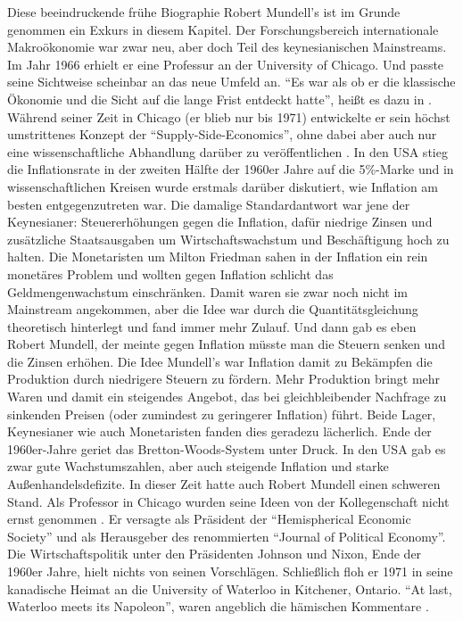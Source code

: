 Diese beeindruckende frühe Biographie Robert Mundell's ist im Grunde genommen ein Exkurs in diesem Kapitel. Der Forschungsbereich internationale Makroökonomie war zwar neu, aber doch Teil des keynesianischen Mainstreams. Im Jahr 1966 erhielt er eine Professur an der University of Chicago. Und passte seine Sichtweise scheinbar an das neue Umfeld an. "`Es war als ob er die klassische Ökonomie und die Sicht auf die lange Frist entdeckt hatte"', heißt es dazu in \textcite[S. 194]{Warsh}.
Während seiner Zeit in Chicago (er blieb nur bis 1971) entwickelte er sein höchst umstrittenes Konzept der "`Supply-Side-Economics"', ohne dabei aber auch nur eine wissenschaftliche Abhandlung darüber zu veröffentlichen \parencite[S. 192]{Warsh}. In den USA stieg die Inflationsrate in der zweiten Hälfte der 1960er Jahre auf die 5\%-Marke und in wissenschaftlichen Kreisen wurde erstmals darüber diskutiert, wie Inflation am besten entgegenzutreten war. Die damalige Standardantwort war jene der Keynesianer: Steuererhöhungen gegen die Inflation, dafür niedrige Zinsen und zusätzliche Staatsausgaben um Wirtschaftswachstum und Beschäftigung hoch zu halten. Die Monetaristen um Milton Friedman sahen in der Inflation ein rein monetäres Problem und wollten gegen Inflation schlicht das Geldmengenwachstum einschränken. Damit waren sie zwar noch nicht im Mainstream angekommen, aber die Idee war durch die Quantitätsgleichung theoretisch hinterlegt und fand immer mehr Zulauf. Und dann gab es eben Robert Mundell, der meinte gegen Inflation müsste man die Steuern senken und die Zinsen erhöhen. Die Idee Mundell's war Inflation damit zu Bekämpfen die Produktion durch niedrigere Steuern zu fördern. Mehr Produktion bringt mehr Waren und damit ein steigendes Angebot, das bei gleichbleibender Nachfrage zu sinkenden Preisen (oder zumindest zu geringerer Inflation) führt. Beide Lager, Keynesianer wie auch Monetaristen fanden dies geradezu lächerlich. Ende der 1960er-Jahre geriet das Bretton-Woods-System unter Druck. In den USA gab es zwar gute Wachstumszahlen, aber auch steigende Inflation und starke Außenhandelsdefizite. In dieser Zeit hatte auch Robert Mundell einen schweren Stand. Als Professor in Chicago wurden seine Ideen von der Kollegenschaft nicht ernst genommen \parencite[S. 195]{Warsh}. Er versagte als Präsident der "`Hemispherical Economic Society"' und als Herausgeber des renommierten "`Journal of Political Economy"'. Die Wirtschaftspolitik unter den Präsidenten Johnson und Nixon, Ende der 1960er Jahre, hielt nichts von seinen Vorschlägen. Schließlich floh er 1971 in seine kanadische Heimat an die University of Waterloo in Kitchener, Ontario. "`At last, Waterloo meets its Napoleon"', waren angeblich die hämischen Kommentare \parencite[S. 195]{Warsh}.

